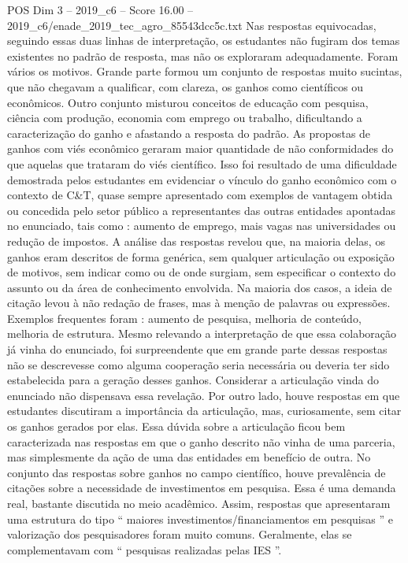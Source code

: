 \begin{textsample}{POS Dim 3 – 2019\_c6 – Score 16.00 – 2019\_c6/enade\_2019\_tec\_agro\_85543dcc5c.txt}
Nas respostas equivocadas, seguindo essas duas linhas de interpretação, os estudantes não fugiram dos temas existentes no padrão de resposta, mas não os exploraram adequadamente.
Foram vários os motivos.
Grande parte formou um conjunto de respostas muito sucintas, que não chegavam a qualificar, com clareza, os ganhos como científicos ou econômicos.
Outro conjunto misturou conceitos de educação com pesquisa, ciência com produção, economia com emprego ou trabalho, dificultando a caracterização do ganho e afastando a resposta do padrão.
As propostas de ganhos com viés econômico geraram maior quantidade de não conformidades do que aquelas que trataram do viés científico.
Isso foi resultado de uma dificuldade demostrada pelos estudantes em evidenciar o vínculo do ganho econômico com o contexto de C\&T, quase sempre apresentado com exemplos de vantagem obtida ou concedida pelo setor público a representantes das outras entidades apontadas no enunciado, tais como : aumento de emprego, mais vagas nas universidades ou redução de impostos.
A análise das respostas revelou que, na maioria delas, os ganhos eram descritos de forma genérica, sem qualquer articulação ou exposição de motivos, sem indicar como ou de onde surgiam, sem especificar o contexto do assunto ou da área de conhecimento envolvida.
Na maioria dos casos, a ideia de citação levou à não redação de frases, mas à menção de palavras ou expressões.
Exemplos frequentes foram : aumento de pesquisa, melhoria de conteúdo, melhoria de estrutura.
Mesmo relevando a interpretação de que essa colaboração já vinha do enunciado, foi surpreendente que em grande parte dessas respostas não se descrevesse como alguma cooperação seria necessária ou deveria ter sido estabelecida para a geração desses ganhos.
Considerar a articulação vinda do enunciado não dispensava essa revelação.
Por outro lado, houve respostas em que estudantes discutiram a importância da articulação, mas, curiosamente, sem citar os ganhos gerados por elas.
Essa dúvida sobre a articulação ficou bem caracterizada nas respostas em que o ganho descrito não vinha de uma parceria, mas simplesmente da ação de uma das entidades em benefício de outra.
No conjunto das respostas sobre ganhos no campo científico, houve prevalência de citações sobre a necessidade de investimentos em pesquisa.
Essa é uma demanda real, bastante discutida no meio acadêmico.
Assim, respostas que apresentaram uma estrutura do tipo “ maiores investimentos/financiamentos em pesquisas ” e valorização dos pesquisadores foram muito comuns.
Geralmente, elas se complementavam com “ pesquisas realizadas pelas IES ”.

\end{textsample}

